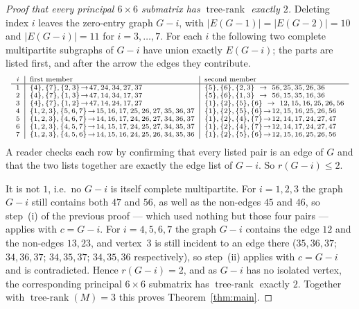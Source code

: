 \documentclass[11pt]{amsart}
\theoremstyle{remark}
\DeclareMathOperator{\trank}{tree\text{-}rank}
\begin{document}
\begin{proof}[Proof that every principal $6\times6$ submatrix has $\trank$ exactly $2$]
Deleting index $i$ leaves the zero-entry graph $G-i$, with $|E(G-1)|=|E(G-2)|=10$ and
$|E(G-i)|=11$ for $i=3,\dots,7$. For each $i$ the following two complete multipartite subgraphs
of $G-i$ have union exactly $E(G-i)$; the parts are listed first, and after the arrow the edges
they contribute.
\[
\scriptsize
\begin{array}{c|l|l}
 i & \text{first member} & \text{second member}\\\hline
 1 & \{4\},\{7\},\{2,3\}\!\to\!47,24,34,27,37 & \{5\},\{6\},\{2,3\}\ \rightarrow\
     56,25,35,26,36\\
 2 & \{4\},\{7\},\{1,3\}\!\to\!47,14,34,17,37 & \{5\},\{6\},\{1,3\}\ \rightarrow\
     56,15,35,16,36\\
 3 & \{4\},\{7\},\{1,2\}\!\to\!47,14,24,17,27 & \{1\},\{2\},\{5\},\{6\}\ \rightarrow\
     12,15,16,25,26,56\\
 4 & \{1,2,3\},\{5,6,7\}\!\to\!15,16,17,25,26,27,35,36,37 &
     \{1\},\{2\},\{5\},\{6\}\!\to\!12,15,16,25,26,56\\
 5 & \{1,2,3\},\{4,6,7\}\!\to\!14,16,17,24,26,27,34,36,37 &
     \{1\},\{2\},\{4\},\{7\}\!\to\!12,14,17,24,27,47\\
 6 & \{1,2,3\},\{4,5,7\}\!\to\!14,15,17,24,25,27,34,35,37 &
     \{1\},\{2\},\{4\},\{7\}\!\to\!12,14,17,24,27,47\\
 7 & \{1,2,3\},\{4,5,6\}\!\to\!14,15,16,24,25,26,34,35,36 &
     \{1\},\{2\},\{5\},\{6\}\!\to\!12,15,16,25,26,56
\end{array}
\]
A reader checks each row by confirming that every listed pair is an edge of $G$ and that the
two lists together are exactly the edge list of $G-i$. So $r(G-i)\le2$.

It is not $1$, i.e.\ no $G-i$ is itself complete multipartite. For $i=1,2,3$ the graph $G-i$
still contains both $47$ and $56$, as well as the non-edges $45$ and $46$, so step~(i) of the
previous proof --- which used nothing but those four pairs --- applies with $c=G-i$. For
$i=4,5,6,7$ the graph $G-i$ contains the edge $12$ and the non-edges $13,23$, and vertex~$3$ is
still incident to an edge there ($35,36,37$; $34,36,37$; $34,35,37$; $34,35,36$ respectively),
so step~(ii) applies with $c=G-i$ and is contradicted. Hence $r(G-i)=2$, and as $G-i$ has no
isolated vertex, the corresponding principal
$6\times6$ submatrix has $\trank$ exactly $2$. Together with $\trank(M)=3$ this proves
Theorem~\ref{thm:main}.
\end{proof}
\end{document}
